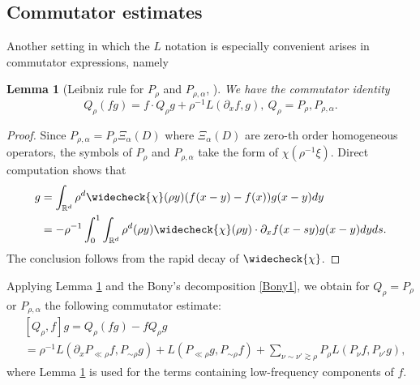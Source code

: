 \documentclass[11pt,letterpaper,reqno]{amsart}
\numberwithin{equation}{section}
\newtheorem{lemma}[theorem]{Lemma}
\theoremstyle{definition}
\theoremstyle{remark}
\newcommand{\pa}{\partial}
\begin{document}
\subsection{Commutator estimates}
Another setting in which the 
\(L\) notation is especially convenient  arises in commutator expressions, namely
\begin{lemma}[Leibniz rule for $P_\rho$ and $P_{\rho,\alpha}$, \cite{TaoCMP02}]  \label{lem_com}
We have the commutator identity
\[
Q_\rho(f g)=f \cdot Q_\rho g+\rho^{-1} L\left(\partial_x f,  g\right),\ Q_\rho = P_\rho,  P_{\rho,\alpha}.
\]
\end{lemma}  
\begin{proof}
    Since  $P_{\rho,\alpha} = P_{\rho}\Xi_\alpha(D)$ where $\Xi_\alpha(D)$ are zero-th order homogeneous operators, the symbols of $P_\rho$ and $ P_{\rho,\alpha}  $  take the form of $\chi(\rho^{-1}\xi)$. Direct computation shows that 
\begin{align*}
    [Q_\rho, f]g &= \int_{\mathbb{R}^d} \rho^d\widecheck{\chi}(\rho y)(f(x-y)-f(x))g(x-y)dy\\
    & = -\rho^{-1}\int^1_0\int_{\mathbb{R}^d} \rho^d (\rho y) \widecheck{\chi}(\rho y)\cdot \pa_x f(x-sy)g(x-y)dyds.
\end{align*}
The conclusion follows from the rapid decay of $\widecheck{\chi}$.
\end{proof}

Applying Lemma \ref{lem_com} and the Bony's decomposition \eqref{Bony1}, we obtain for $Q_\rho = P_\rho$ or $P_{\rho,\alpha}$ the following commutator estimate:
\begin{align}
&[Q_\rho, f]g = Q_\rho(fg) - f Q_\rho g \label{Bony_com} \\
&= \rho^{-1} L(\partial_x P_{\ll \rho} f, P_{\sim \rho} g) + L(P_{\ll \rho} g, P_{\sim \rho} f) + \sum_{\nu \sim \nu' \gtrsim \rho} P_\rho L(P_\nu f, P_{\nu'} g), \nonumber
\end{align}
where Lemma \ref{lem_com} is used for the terms containing low-frequency components of $f$.
\end{document}
